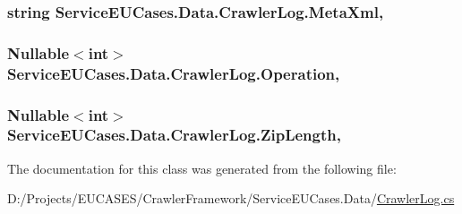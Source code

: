 \hypertarget{class_service_e_u_cases_1_1_data_1_1_crawler_log_abf82886310fb134885c6cc1193d60512}{
\subsubsection[{Meta\-Xml}]{\setlength{\rightskip}{0pt plus 5cm}string Service\-E\-U\-Cases.\-Data.\-Crawler\-Log.\-Meta\-Xml\hspace{0.3cm}{\ttfamily [get]}, {\ttfamily [set]}}}\label{class_service_e_u_cases_1_1_data_1_1_crawler_log_abf82886310fb134885c6cc1193d60512}
\hypertarget{class_service_e_u_cases_1_1_data_1_1_crawler_log_ae457ab6f2f1dd73d06bf0c4528bc7f51}{
\subsubsection[{Operation}]{\setlength{\rightskip}{0pt plus 5cm}Nullable$<$int$>$ Service\-E\-U\-Cases.\-Data.\-Crawler\-Log.\-Operation\hspace{0.3cm}{\ttfamily [get]}, {\ttfamily [set]}}}\label{class_service_e_u_cases_1_1_data_1_1_crawler_log_ae457ab6f2f1dd73d06bf0c4528bc7f51}
\hypertarget{class_service_e_u_cases_1_1_data_1_1_crawler_log_a88b172286eb2a3f053a2ed41c47e4724}{
\subsubsection[{Zip\-Length}]{\setlength{\rightskip}{0pt plus 5cm}Nullable$<$int$>$ Service\-E\-U\-Cases.\-Data.\-Crawler\-Log.\-Zip\-Length\hspace{0.3cm}{\ttfamily [get]}, {\ttfamily [set]}}}\label{class_service_e_u_cases_1_1_data_1_1_crawler_log_a88b172286eb2a3f053a2ed41c47e4724}


The documentation for this class was generated from the following file\-:\begin{DoxyCompactItemize}
\item 
D\-:/\-Projects/\-E\-U\-C\-A\-S\-E\-S/\-Crawler\-Framework/\-Service\-E\-U\-Cases.\-Data/\hyperlink{_service_e_u_cases_8_data_2_crawler_log_8cs}{Crawler\-Log.\-cs}\end{DoxyCompactItemize}
